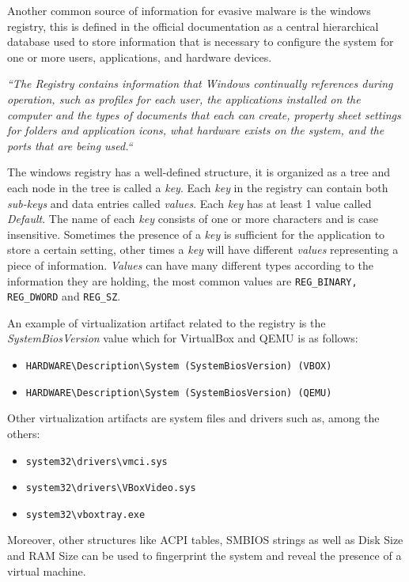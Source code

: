 Another common source of information for evasive malware is the windows registry, this is defined in the official documentation as a central hierarchical database used to store information that is necessary to configure the system for one or more users, applications, and hardware devices.

\textit{``The Registry contains information that Windows continually references during operation, such as profiles for each user, the applications installed on the computer and the types of documents that each can create, property sheet settings for folders and application icons, what hardware exists on the system, and the ports that are being used.``}~\cite{windocs}

The windows registry has a well-defined structure, it is organized as a tree and each node in the tree is called a \textit{key}. Each \textit{key} in the registry can contain both \textit{sub-keys} and data entries called \textit{values}. Each \textit{key} has at least 1 value called \textit{Default}. The name of each \textit{key} consists of one or more characters and is case insensitive. Sometimes the presence of a \textit{key} is sufficient for the application to store a certain setting, other times a \textit{key} will have different \textit{values} representing a piece of information. \textit{Values} can have many different types according to the information they are holding, the most common values are \lstinline{REG_BINARY, REG_DWORD} and \lstinline{REG_SZ}. 

An example of virtualization artifact related to the registry is the \textit{SystemBiosVersion} value which for VirtualBox and QEMU is as follows:
\begin{itemize}
    \item \lstinline{HARDWARE\Description\System (SystemBiosVersion) (VBOX)}
    \item \lstinline{HARDWARE\Description\System (SystemBiosVersion) (QEMU)} 
\end{itemize}

Other virtualization artifacts are system files and drivers such as, among the others:
\begin{itemize}
    \item \lstinline{system32\drivers\vmci.sys}
    \item \lstinline{system32\drivers\VBoxVideo.sys}
    \item \lstinline{system32\vboxtray.exe}
\end{itemize}

Moreover, other structures like ACPI tables, SMBIOS strings as well as Disk Size and RAM Size can be used to fingerprint the system and reveal the presence of a virtual machine. 


